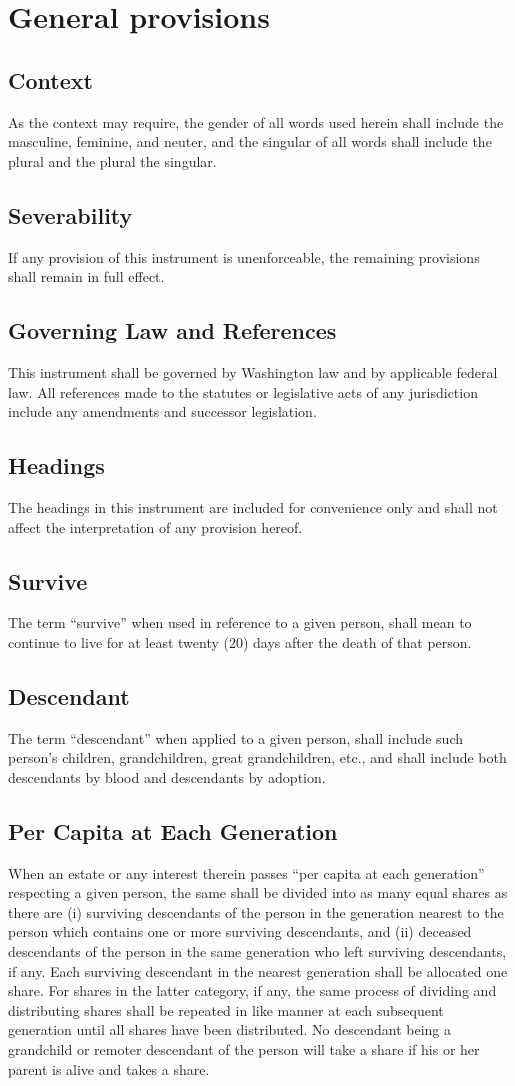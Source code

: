 \documentclass[11.5pt]{article}
\begin{document}
\section{General provisions}
\subsection{Context} As the context may require, the gender of all words used herein shall include the masculine, feminine, and neuter, and the singular of all words shall include the plural and the plural the singular.
\subsection{Severability} If any provision of this instrument is unenforceable, the remaining provisions shall remain in full effect.
\subsection{Governing Law and References} This instrument shall be governed by Washington law and by applicable federal law. All references made to the statutes or legislative acts of any jurisdiction include any amendments and successor legislation.
\subsection{Headings} The headings in this instrument are included for convenience only and shall not affect the interpretation of any provision hereof.
\subsection{Survive} The term “survive” when used in reference to a given person, shall mean to continue to live for at least twenty (20) days after the death of that person.
\subsection{Descendant} The term “descendant” when applied to a given person, shall include such person’s children, grandchildren, great grandchildren, etc., and shall include both descendants by blood and descendants by adoption.
\subsection{Per Capita at Each Generation} When an estate or any interest therein passes ``per capita at each generation'' respecting a given person, the same shall be divided into as many equal shares as there are (i) surviving descendants of the person in the generation nearest to the person which contains one or more surviving descendants, and (ii) deceased descendants of the person in the same generation who left surviving descendants, if any. Each surviving descendant in the nearest generation shall be allocated one share. For shares in the latter category, if any, the same process of dividing and distributing shares shall be repeated in like manner at each subsequent generation until all shares have been distributed. No descendant being a grandchild or remoter descendant of the person will take a share if his or her parent is alive and takes a share.
\end{document}
